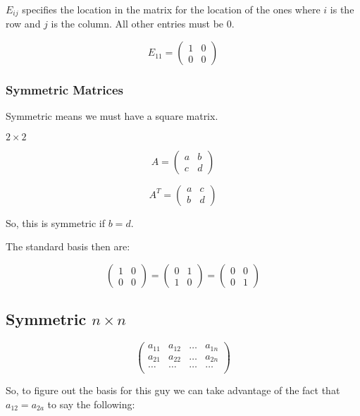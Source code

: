 \documentclass[a4paper]{article}
\begin{document}
$E_{ij}$ specifies the location in the matrix for the location of the ones where $i$ is the row and $j$ is the column. All other entries must be 0.

\[
	E_{11} = 
	\begin{pmatrix}
		1 & 0 \\
		0 & 0
	\end{pmatrix}
\]

\subsubsection*{Symmetric Matrices}

Symmetric means we must have a square matrix.

$2 \times 2$

\[
A = 
\begin{pmatrix}
	a & b \\
	c & d
\end{pmatrix}
\]

\[
A^T = 
\begin{pmatrix}
	a & c \\
	b & d
\end{pmatrix}
\]

So, this is symmetric if $b = d$.

The standard basis then are:

\[
	\begin{pmatrix}
		1 & 0 \\
		0 & 0
	\end{pmatrix} =
	\begin{pmatrix}
		0 & 1 \\
		1 & 0
	\end{pmatrix} =
	\begin{pmatrix}
		0 & 0 \\
		0 & 1
	\end{pmatrix}
\]

\subsection*{Symmetric $n \times n$}

\[
	\begin{pmatrix}
		a_{11} & a_{12}  & \dots & a_{1n} \\
		a_{21} & a_{22} & \dots & a_{2n} \\
		\dots & \dots & \dots & \dots \\
	\end{pmatrix}
\]

So, to figure out the basis for this guy we can take advantage of the fact that $a_{12} = a_{2a}$ to say the following:
\end{document}
